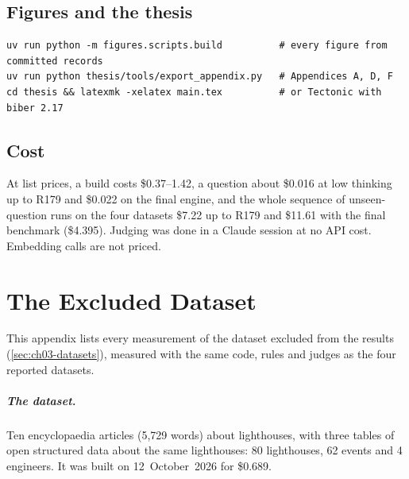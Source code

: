 \section*{Figures and the thesis}
\begin{lstlisting}
uv run python -m figures.scripts.build          # every figure from committed records
uv run python thesis/tools/export_appendix.py   # Appendices A, D, F
cd thesis && latexmk -xelatex main.tex          # or Tectonic with biber 2.17
\end{lstlisting}

\section*{Cost}
At list prices, a build costs \$0.37--1.42, a question about \$0.016 at low thinking up to R179 and \$0.022 on the final
engine, and the whole sequence of unseen-question runs on the four datasets \$7.22 up to R179 and \$11.61 with the
final benchmark (\$4.395). Judging was done in a Claude session at no API cost. Embedding calls
are not priced.

\chapter{The Excluded Dataset}\label{app:excluded-dataset}

This appendix lists every measurement of the dataset excluded from the results (\cref{sec:ch03-datasets}),
measured with the same code, rules and judges as the four reported datasets.

\paragraph{The dataset.} Ten encyclopaedia articles (5{,}729 words) about lighthouses, with three tables of
open structured data about the same lighthouses: 80 lighthouses, 62 events and 4 engineers. It was built on
12~October~2026 for \$0.689.

